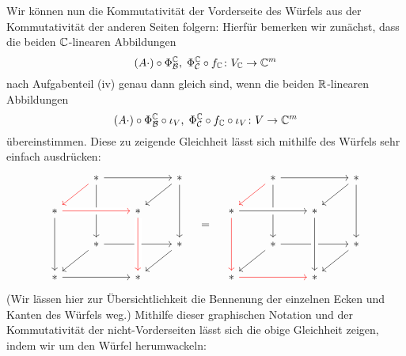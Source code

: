 \documentclass[a4paper,10pt]{article}
\begin{document}
Wir können nun die Kommutativität der Vorderseite des Würfels aus der Kommutativität der anderen Seiten folgern:
Hierfür bemerken wir zunächst, dass die beiden $\mathbb{C}$-linearen Abbildungen
\[
  (A \cdot) \circ \Phi^{\mathbb{C}}_{\mathcal{B}}, \;
  \Phi^{\mathbb{C}}_{\mathcal{C}} \circ f_{\mathbb{C}}
  \colon
  V_{\mathbb{C}} \to \mathbb{C}^m
\]
nach Aufgabenteil (iv) genau dann gleich sind, wenn die beiden $\mathbb{R}$-linearen Abbildungen
\[
    (A \cdot) \circ \Phi^{\mathbb{C}}_{\mathcal{B}} \circ \iota_V, \;
    \Phi^{\mathbb{C}}_{\mathcal{C}} \circ f_{\mathbb{C}} \circ \iota_V
    \colon
    V \to \mathbb{C}^m
\]
übereinstimmen.
Diese zu zeigende Gleichheit lässt sich mithilfe des Würfels sehr einfach ausdrücken:
\[
  \begin{tikzcd}
      {}
    & *
      \arrow[rr]
      \arrow[ld, red]
      \arrow[dd]
    & {}
    & *
      \arrow[ld]
      \arrow[dd]
    \\
      *
      \arrow[rr, crossing over, red]
      \arrow[dd]
    & {}
    & *
      \arrow[dd]
    & {}
    \\
      {}
    & *
      \arrow[rr]
      \arrow[ld]
    & {}
    & *
      \arrow[ld]
    \\
      *
      \arrow[rr]
    & {}
    & *
      \arrow[from=uu, crossing over, red]
    & {}
  \end{tikzcd}
  \quad=\quad
  \begin{tikzcd}
      {}
    & *
      \arrow[rr]
      \arrow[ld, red]
      \arrow[dd]
    & {}
    & *
      \arrow[ld]
      \arrow[dd]
    \\
      *
      \arrow[rr, crossing over]
      \arrow[dd, red]
    & {}
    & *
      \arrow[dd]
    & {}
    \\
      {}
    & *
      \arrow[rr]
      \arrow[ld]
    & {}
    & *
      \arrow[ld]
    \\
      *
      \arrow[rr, red]
    & {}
    & *
      \arrow[from=uu, crossing over]
    & {}
  \end{tikzcd}
\]
(Wir lässen hier zur Übersichtlichkeit die Bennenung der einzelnen Ecken und Kanten des Würfels weg.)
Mithilfe dieser graphischen Notation und der Kommutativität der nicht-Vorderseiten lässt sich die obige Gleichheit zeigen, indem wir um den Würfel herumwackeln:
\end{document}
